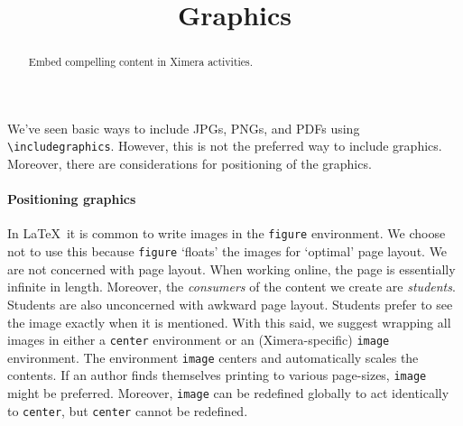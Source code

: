 \documentclass{ximera}
\title{Graphics}
\begin{document}
\begin{abstract}
  Embed compelling content in Ximera activities.
\end{abstract}
\maketitle

We've seen basic ways to include JPGs, PNGs, and PDFs using
\verb!\includegraphics!. However, this is not the preferred way to include
graphics. Moreover, there are considerations for positioning of the graphics.

\paragraph{Positioning graphics}

In \LaTeX\ it is common to write images in the \verb!figure! environment. We
choose not to use this because \verb!figure! `floats' the images for `optimal'
page layout. We are not concerned with page layout. When working online, the
page is essentially infinite in length. Moreover, the \textit{consumers} of the
content we create are \textit{students}. Students are also unconcerned with
awkward page layout. Students prefer to see the image exactly when it is
mentioned. With this said, we suggest wrapping all images in either a
\verb!center! environment or an (Ximera-specific) \verb!image! environment.
The environment \verb!image! centers and automatically scales the contents.  If
an author finds themselves printing to various page-sizes, \verb!image! might
be preferred. Moreover, \verb!image! can be redefined globally to act
identically to \verb!center!, but \verb!center! cannot be redefined.
\end{document}
